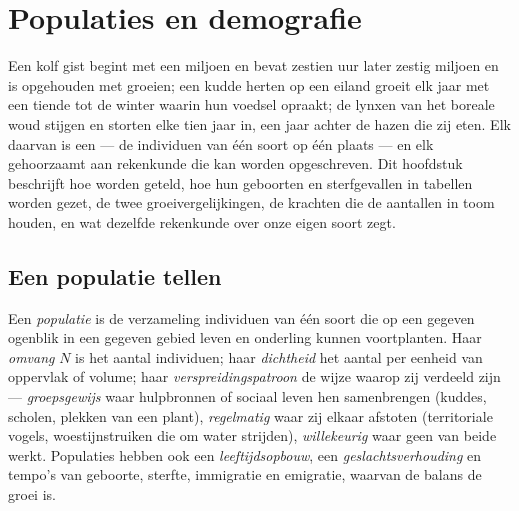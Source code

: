 \chapter{Populaties en demografie}\label{ch:b1:populations}

Een kolf gist begint met een miljoen  en bevat zestien uur later
zestig miljoen en is opgehouden met groeien; een kudde herten op een eiland
groeit elk jaar met een tiende tot de winter waarin hun voedsel opraakt; de
lynxen van het boreale woud stijgen en storten elke tien jaar in, een jaar
achter de hazen die zij eten. Elk daarvan is een \emph{} --- de
individuen van één soort op één plaats --- en elk gehoorzaamt aan
rekenkunde die kan worden opgeschreven. Dit hoofdstuk beschrijft hoe
 worden geteld, hoe hun geboorten en sterfgevallen in tabellen
worden gezet, de twee groeivergelijkingen, de krachten die de aantallen in
toom houden, en wat dezelfde rekenkunde over onze eigen soort zegt.

\section{Een populatie tellen}

\begin{definition}\label{def:b1:populations:population}
Een \emph{populatie} is de verzameling individuen van één soort die op een
gegeven ogenblik in een gegeven gebied leven en onderling kunnen
voortplanten. Haar \emph{omvang} $N$ is het aantal individuen; haar
\emph{dichtheid} het aantal per eenheid van oppervlak of volume; haar
\emph{verspreidingspatroon} de wijze waarop zij verdeeld zijn ---
\emph{groepsgewijs} waar hulpbronnen of sociaal leven hen samenbrengen
(kuddes, scholen, plekken van een plant), \emph{regelmatig} waar zij elkaar
afstoten (territoriale vogels, woestijnstruiken die om water strijden),
\emph{willekeurig} waar geen van beide werkt. Populaties hebben ook een
\emph{leeftijdsopbouw}, een \emph{geslachtsverhouding} en tempo's van
geboorte, sterfte, immigratie en emigratie, waarvan de balans de groei is.
\end{definition}

